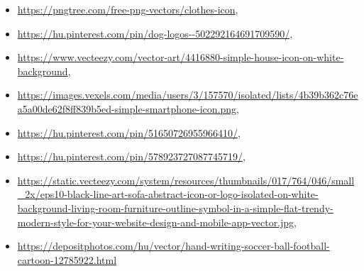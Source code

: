 \documentclass[]{thesis-ekf}
\theoremstyle{definition}
\theoremstyle{remark}
\begin{document}
\begin{thebibliography}{2}
\begin{itemize}
				\item \url{https://pngtree.com/free-png-vectors/clothes-icon},
				\item \url{https://hu.pinterest.com/pin/dog-logos--502292164691709590/},
				\item \url{https://www.vecteezy.com/vector-art/4416880-simple-house-icon-on-white-background},
				\item \url{https://images.vexels.com/media/users/3/157570/isolated/lists/4b39b362c76ea5a00de62f8ff839b5ed-simple-smartphone-icon.png},
				\item \url{https://hu.pinterest.com/pin/51650726955966410/},
				\item \url{https://hu.pinterest.com/pin/578923727087745719/},
				\item \url{https://static.vecteezy.com/system/resources/thumbnails/017/764/046/small_2x/eps10-black-line-art-sofa-abstract-icon-or-logo-isolated-on-white-background-living-room-furniture-outline-symbol-in-a-simple-flat-trendy-modern-style-for-your-website-design-and-mobile-app-vector.jpg},
				\item \url{https://depositphotos.com/hu/vector/hand-writing-soccer-ball-football-cartoon-12785922.html}
			
			\end{itemize}
		
		
	\end{thebibliography}
	
	
\end{document}
